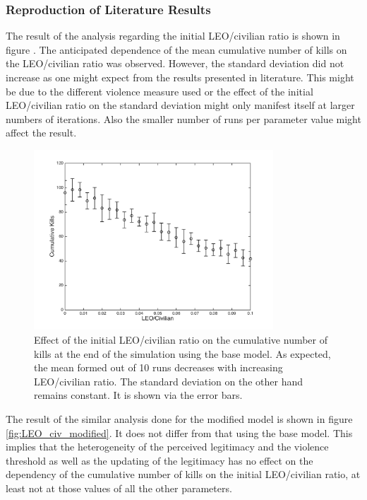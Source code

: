 \documentclass[11pt]{article}
\begin{document}
\subsubsection{Reproduction of Literature Results}
The result of the analysis regarding the initial LEO/civilian ratio is shown in figure \label{fig:LEO_civ_base}. The anticipated dependence of the mean cumulative number of kills on the LEO/civilian ratio was observed. However, the standard deviation did not increase as one might expect from the results presented in literature. This might be due to the different violence measure used or the effect of the initial LEO/civilian ratio on the standard deviation might only manifest itself at larger numbers of iterations. Also the smaller number of runs per parameter value might affect the result.
\begin{figure}[!htbp]
	\centering
		\includegraphics[width=0.80\textwidth]{../../code/base_model/cum_kills_vs_LEO_civ.png}
	\caption{Effect of the initial LEO/civilian ratio on the cumulative number of kills at the end of the simulation using the base model. As expected, the mean formed out of 10 runs decreases with increasing LEO/civilian ratio. The standard deviation on the other hand remains constant. It is shown via the error bars.}
	\label{fig:LEO_civ_base}
\end{figure}
The result of the similar analysis done for the modified model is shown in figure \ref{fig:LEO_civ_modified}. It does not differ from that using the base model. This implies that the heterogeneity of the perceived legitimacy and the violence threshold as well as the updating of the legitimacy has no effect on the dependency of the cumulative number of kills on the initial LEO/civilian ratio, at least not at those values of all the other parameters. 
\end{document}
